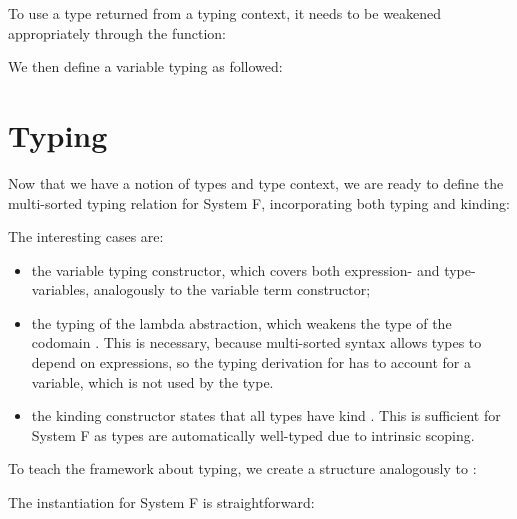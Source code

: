 \documentclass[a4paper, UKenglish, cleveref, autoref, thm-restate]{lipics-v2021}
\newenvironment{LibCode*}{%
  \begin{tcolorbox}[%
    colframe=white,%
    boxrule=0.0pt,%
    top=2.5pt,%
    left=2.5pt,%
    bottom=2.5pt,%
    right=2.5pt,%
    before skip=5pt,%
    after skip=5pt,%
    boxsep=0pt%
  ]
}{%
  \end{tcolorbox}%
}
\newcommand*\LibCode[1]{\begin{LibCode*}{#1}\end{LibCode*}}
\newcommand*\AppCode[1]{{#1}}
\newcommand*\ACode[1]{\AgdaFontStyle{\textcolor{mygray}{#1}}}
\newcommand*\ACon[1]{\AgdaInductiveConstructor{#1}}
\newcommand*\ADef[1]{\AgdaFunction{#1}}
\begin{document}
  To use a type returned from a typing context, it needs to be
  weakened appropriately through the \ACode{\ADef{wk-telescope}} function:

  \noindent
  \begin{minipage}[t]{1.0\linewidth}
    \begin{minipage}[t]{0.55\linewidth}
      \LibCode\KContextLookupI
    \end{minipage}
    \begin{minipage}[t]{0.45\linewidth}
      \LibCode\KContextLookupII
    \end{minipage}
  \end{minipage}

  We then define a variable typing as followed:
  \LibCode\KVariableTyping

  \section{Typing}
  \label{sec:typing}
  Now that we have a notion of types and type context, we are ready to define
  the multi-sorted typing relation for System F, incorporating both
  typing and kinding:
  \AppCode\FTyping


  The interesting cases are:
  \begin{itemize}
  \item
    the variable typing constructor, which covers both expression- and
    type-variables, analogously to the variable term constructor;
  \item
    the typing \ACode{\ACon{⊢λ}} of the lambda abstraction, which
    weakens the type of the codomain \ACode{t₂}.
    This is necessary, because multi-sorted syntax allows types
    to depend on expressions, so the typing derivation for \ACode{e}
    has to account for a variable, which is not used by the type.
  \item
    the kinding constructor \ACode{\ACon{⊢τ}} states that all types
    have kind \ACode{\ACon{★}}. This is sufficient for System F as types
    are automatically well-typed due to intrinsic scoping.
  \end{itemize}
  To teach the framework about typing, we create a structure analogously to
  \ACode{\ACon{Syntax}}:
  \LibCode\KTyping
  The instantiation for System F is straightforward:
  \AppCode\FTypingInst
\end{document}
